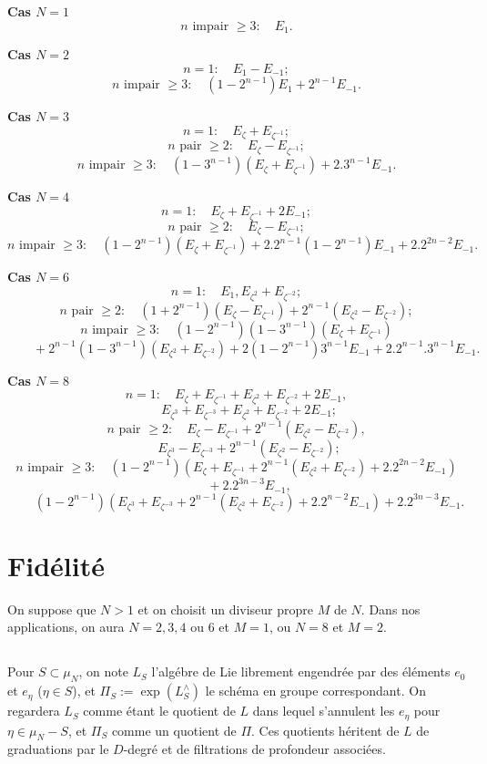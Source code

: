 \documentclass[11pt,a4paper]{article}
\theoremstyle{plain}
\theoremstyle{definition}
\begin{document}
\medskip
\noindent\textbf{Cas $N=1$}
\[
n \text{ impair } \geq 3: \quad E_1.
\]

\medskip
\noindent\textbf{Cas $N=2$}
\[
n=1: \quad E_1 - E_{-1};
\]
\[
n \text{ impair } \geq 3: \quad (1-2^{n-1})E_1 + 2^{n-1}E_{-1}.
\]

\medskip
\noindent\textbf{Cas $N=3$}
\[
n=1: \quad E_\zeta + E_{\zeta^{-1}};
\]
\[
n \text{ pair } \geq 2: \quad E_\zeta - E_{\zeta^{-1}};
\]
\[
n \text{ impair } \geq 3: \quad (1-3^{n-1})(E_\zeta + E_{\zeta^{-1}}) + 2.3^{n-1}E_{-1}.
\]

\medskip
\noindent\textbf{Cas $N=4$}
\[
n=1: \quad E_\zeta + E_{\zeta^{-1}} + 2E_{-1};
\]
\[
n \text{ pair } \geq 2: \quad E_\zeta - E_{\zeta^{-1}};
\]
\[
n \text{ impair } \geq 3: \quad (1-2^{n-1})(E_\zeta + E_{\zeta^{-1}}) + 2.2^{n-1}(1-2^{n-1})E_{-1} + 2.2^{2n-2}E_{-1}.
\]

\medskip
\noindent\textbf{Cas $N=6$}
\[
n=1: \quad E_1, E_{\zeta^2} + E_{\zeta^{-2}};
\]
\[
n \text{ pair } \geq 2: \quad (1+2^{n-1})(E_\zeta - E_{\zeta^{-1}}) + 2^{n-1}(E_{\zeta^2} - E_{\zeta^{-2}});
\]
\[
n \text{ impair } \geq 3: \quad (1-2^{n-1})(1-3^{n-1})(E_\zeta + E_{\zeta^{-1}})
\]
\[
\qquad + 2^{n-1}(1-3^{n-1})(E_{\zeta^2} + E_{\zeta^{-2}}) + 2(1-2^{n-1})3^{n-1}E_{-1} + 2.2^{n-1}.3^{n-1}E_{-1}.
\]

\medskip
\noindent\textbf{Cas $N=8$}
\[
n=1: \quad E_\zeta + E_{\zeta^{-1}} + E_{\zeta^2} + E_{\zeta^{-2}} + 2E_{-1},
\]
\[
\qquad E_{\zeta^3} + E_{\zeta^{-3}} + E_{\zeta^2} + E_{\zeta^{-2}} + 2E_{-1};
\]
\[
n \text{ pair } \geq 2: \quad E_\zeta - E_{\zeta^{-1}} + 2^{n-1}(E_{\zeta^2} - E_{\zeta^{-2}}),
\]
\[
\qquad E_{\zeta^3} - E_{\zeta^{-3}} + 2^{n-1}(E_{\zeta^2} - E_{\zeta^{-2}});
\]
\[
n \text{ impair } \geq 3: \quad (1-2^{n-1})(E_\zeta + E_{\zeta^{-1}} + 2^{n-1}(E_{\zeta^2} + E_{\zeta^{-2}}) + 2.2^{2n-2}E_{-1})
\]
\[
\qquad + 2.2^{3n-3}E_{-1},
\]
\[
\qquad (1-2^{n-1})(E_{\zeta^3} + E_{\zeta^{-3}} + 2^{n-1}(E_{\zeta^2} + E_{\zeta^{-2}}) + 2.2^{n-2}E_{-1}) + 2.2^{3n-3}E_{-1}.
\]

\section{Fid\'elit\'e}
\label{sec:4}

On suppose que $N > 1$ et on choisit un diviseur propre $M$ de $N$. Dans nos applications, on aura $N = 2,3,4$ ou $6$ et $M = 1$, ou $N = 8$ et $M = 2$.

\subsection{}
Pour $S \subset \mu_N$, on note $L_S$ l'alg\'ebre de Lie librement engendr\'ee par des \'el\'ements $e_0$ et $e_\eta$ ($\eta \in S$), et $\Pi_S := \exp(L_S^{\wedge})$ le sch\'ema en groupe correspondant. On regardera $L_S$ comme \'etant le quotient de $L$ dans lequel s'annulent les $e_\eta$ pour $\eta \in \mu_N - S$, et $\Pi_S$ comme un quotient de $\Pi$. Ces quotients h\'eritent de $L$ de graduations par le $D$-degr\'e et de filtrations de profondeur associ\'ees.
\end{document}
